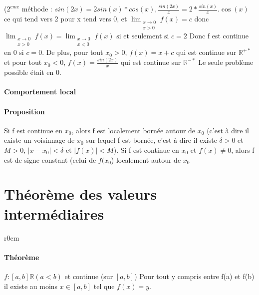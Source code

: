 		($2^{eme}$ méthode : $sin(2x) = 2sin(x)*cos(x), \frac{sin(2x)}{x} = 2*\frac{sin(x)}{x}.\cos(x)$ ce qui tend vers 2 pour x tend vers 0, et $\lim_{\substack{x\to 0 \\  x > 0}} f(x) = c$ donc $\lim_{\substack{x\to 0 \\  x > 0}} f(x) = \lim_{\substack{x\to 0 \\  x<0}} f(x) \text{ si et seulement si } c =2$
		Donc f est continue en 0 si $c=0$. De plus, pour tout $x_0 > 0$, $f(x) = x+c$ qui est continue sur $\mathbb{R}^{+*}$ et pour tout $x_0 < 0$, $f(x) = \frac{sin(2x)}{x}$ qui est continue sur $\mathbb{R}^{-*}$
		Le seule problème possible était en 0.

\paragraph{Comportement local}
\paragraph{Proposition} Si f est continue en $x_0$, alors f est localement bornée autour de $x_0$ (c'est à dire il existe un voisinnage de $x_0$ sur lequel f est bornée, c'est à dire il existe $\delta > 0$ et $M > 0$, $|x-x_0| < \delta$ et $|f(x)| < M$).
Si f est continue en $x_0$ et $f(x) \neq 0$, alors f est de signe constant (celui de $f(x_0$) localement autour de $x_0$

\section{Théorème des valeurs intermédiaires}


\begin{wrapfigure}{r}{0cm}
\end{wrapfigure}
\paragraph{Théorème} $f:[a, b] \mathbb{R} (a < b)$ et continue (sur $[a, b]$)
Pour tout y compris entre f(a) et f(b) il existe au moins $x\in [a, b]$ tel que $f(x) = y$.

